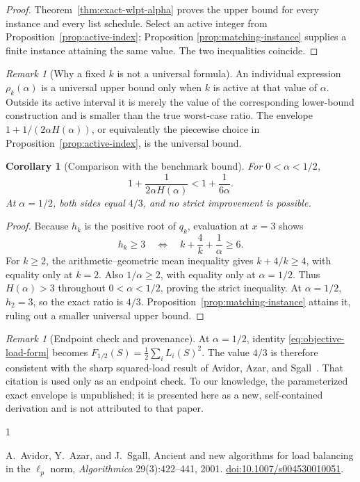 \documentclass[11pt]{article}
\newtheorem{corollary}[theorem]{Corollary}
\theoremstyle{remark}
\newtheorem{remark}[theorem]{Remark}
\begin{document}
\begin{proof}
Theorem~\ref{thm:exact-wlpt-alpha} proves the upper bound for every
instance and every list schedule.  Select an active integer from
Proposition~\ref{prop:active-index}; Proposition
\ref{prop:matching-instance} supplies a finite instance attaining the
same value.  The two inequalities coincide.
\end{proof}

\begin{remark}[Why a fixed $k$ is not a universal formula]
An individual expression $\rho_k(\alpha)$ is a universal upper bound
only when $k$ is active at that value of $\alpha$.  Outside its active
interval it is merely the value of the corresponding lower-bound
construction and is smaller than the true worst-case ratio.  The
envelope $1+1/(2\alpha H(\alpha))$, or equivalently the piecewise
choice in Proposition~\ref{prop:active-index}, is the universal bound.
\end{remark}

\begin{corollary}[Comparison with the benchmark bound]
\label{cor:strict-improvement}
For $0<\alpha<1/2$,
\[
 1+\frac1{2\alpha H(\alpha)}
 <1+\frac1{6\alpha}.
\]
At $\alpha=1/2$, both sides equal $4/3$, and no strict improvement is
possible.
\end{corollary}

\begin{proof}
Because $h_k$ is the positive root of $q_k$, evaluation at $x=3$
shows
\[
 h_k\geq3
 \quad\Longleftrightarrow\quad
 k+\frac4k+\frac1\alpha\geq6.
\]
For $k\geq2$, the arithmetic--geometric mean inequality gives
$k+4/k\geq4$, with equality only at $k=2$.  Also
$1/\alpha\geq2$, with equality only at $\alpha=1/2$.
Thus $H(\alpha)>3$ throughout $0<\alpha<1/2$, proving the strict
inequality.  At $\alpha=1/2$, $h_2=3$, so the exact ratio is $4/3$.
Proposition~\ref{prop:matching-instance} attains it, ruling out a
smaller universal upper bound.
\end{proof}

\begin{remark}[Endpoint check and provenance]
At $\alpha=1/2$, identity \eqref{eq:objective-load-form} becomes
$F_{1/2}(S)=\tfrac12\sum_iL_i(S)^2$.  The value $4/3$ is therefore
consistent with the sharp squared-load result of
Avidor, Azar, and Sgall~\cite{AvidorAzarSgall2001}.  That citation is
used only as an endpoint check.  To our knowledge, the parameterized
exact envelope is unpublished; it is presented here as a new,
self-contained derivation and is not attributed to that paper.
\end{remark}

\begin{thebibliography}{1}

A.~Avidor, Y.~Azar, and J.~Sgall,
\newblock Ancient and new algorithms for load balancing in the
  $\ell_p$ norm,
\newblock \emph{Algorithmica} 29(3):422--441, 2001.
\newblock \href{https://doi.org/10.1007/s004530010051}
  {doi:10.1007/s004530010051}.

\end{thebibliography}
\end{document}
